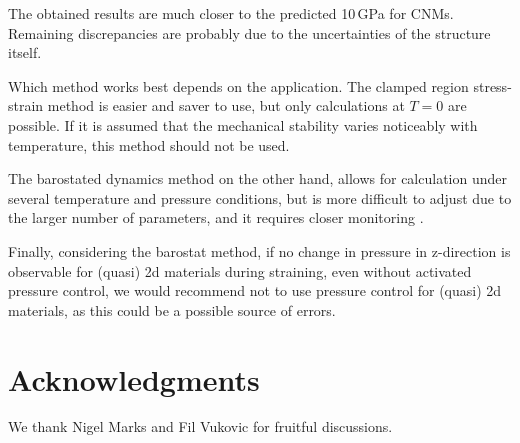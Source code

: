 \documentclass[preprint,12pt]{elsarticle}
\begin{document}
The obtained results are much closer to the predicted 10\,GPa for CNMs.
Remaining discrepancies are probably due to the uncertainties of the structure itself.

Which method works best depends on the application. The clamped region stress-strain method 
is easier and saver to use, but only calculations at $T=0$ are possible.
If it is assumed that the mechanical stability varies noticeably with temperature, 
this method should not be used.

The barostated dynamics method on the other hand, 
allows for calculation under several temperature and pressure conditions, 
but is more difficult to adjust due to the larger number of parameters,
and it requires closer monitoring \cite{CDB:MS17}. 

Finally, considering the barostat method, if no change in pressure in z-direction is observable 
for (quasi) 2d materials during straining, 
even without activated pressure control,
we would recommend not to use pressure control for (quasi) 2d materials, 
as this could be a possible source of errors. 

\section*{Acknowledgments}

We thank Nigel Marks and Fil Vukovic for fruitful discussions.


%
%
\end{document}
